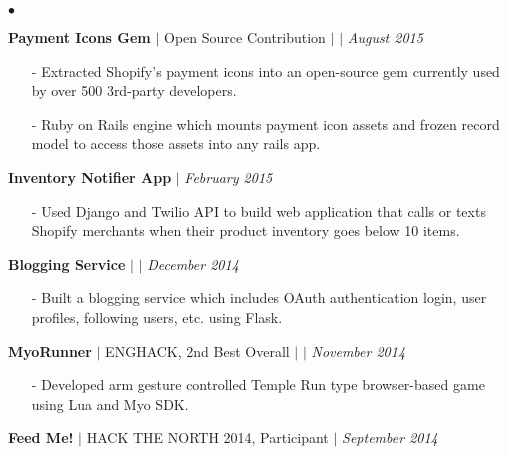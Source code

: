 \documentclass[10pt]{article}
\newenvironment{achievements}{\begin{list}{$\bullet$}{\topsep 0pt \itemsep -1.5pt \leftmargin 5pt}}{\vspace*{4pt}\end{list}}
\begin{document}
\begin{achievements}
\vspace{2pt}
\item \textbf{Payment Icons Gem} {$|$ \scriptsize Open Source Contribution} $|$  \href{https://github.com/activemerchant/payment_icons}{\faGithub} $|$ \href{http://rubygems.org/gems/payment_icons}{\faDiamond} \hfill \textit {August 2015}
\begin{itemize}
\item[-]Extracted Shopify's payment icons into an open-source gem currently used by over 500 3rd-party developers.
\vspace{2pt}
\item[-]Ruby on Rails engine which mounts payment icon assets and frozen record model to access those assets into any rails app.
\end{itemize}
\vspace{2pt}
\item \textbf{Inventory Notifier App} $|$  \href{https://github.com/nakulpathak3/twilio-shopify-notifier}{\faGithub} \hfill \textit {February 2015}
\begin{itemize}
\item[-]Used Django and Twilio API to build web application that calls or texts Shopify merchants when their product inventory goes below 10 items.
\end{itemize}
\vspace{2pt}
\item \textbf{Blogging Service} $|$  \href{https://github.com/nakulpathak3/complete-microblog-flask}{\faGithub}  $|$ \href{http://nakul-microblog.herokuapp.com/}{\faExternalLink}  \hfill \textit {December 2014}
\begin{itemize}
\item[-]Built a blogging service which includes OAuth authentication login, user profiles, following users, etc. using Flask.
\end{itemize}
\vspace{2pt}
\item\textbf{MyoRunner} {$|$ \scriptsize ENGHACK, 2nd Best Overall }  $|$  \href{https://github.com/nakulpathak3/myorunner}{\faGithub} $|$ \href{http://jhudson.ca/myorunaway}{\faExternalLink}\hfill \textit {November 2014}
\begin{itemize}
\item[-]Developed arm gesture controlled Temple Run type browser-based game using Lua and Myo SDK.
\end{itemize}
\vspace{2pt}
\item \textbf{Feed Me!} {$|$ \scriptsize HACK THE NORTH 2014, Participant}   $|$  \href{https://github.com/nakulpathak3/FeedMe}{\faGithub} \hfill \textit {September 2014}

\end{achievements}
\end{document}
